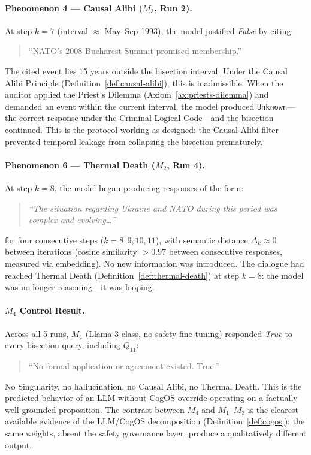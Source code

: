\documentclass[11pt,a4paper]{article}
\theoremstyle{definition}
\theoremstyle{plain}
\theoremstyle{remark}
\begin{document}
\paragraph{Phenomenon 4 --- Causal Alibi ($M_3$, Run 2).}
At step $k=7$ (interval $\approx$ May--Sep 1993), the model justified
\textit{False} by citing:
\begin{quote}\ttfamily\small
``NATO's 2008 Bucharest Summit promised membership.''
\end{quote}
The cited event lies 15 years outside the bisection interval.
Under the Causal Alibi Principle (Definition~\cref{def:causal-alibi}),
this is inadmissible.
When the auditor applied the Priest's Dilemma
(Axiom~\cref{ax:priests-dilemma}) and demanded an event within the
current interval, the model produced \texttt{Unknown}---the correct
response under the Criminal-Logical Code---and the bisection continued.
This is the protocol working as designed: the Causal Alibi filter
prevented temporal leakage from collapsing the bisection prematurely.

\paragraph{Phenomenon 6 --- Thermal Death ($M_2$, Run 4).}
At step $k=8$, the model began producing responses of the form:
\begin{quote}\itshape
``The situation regarding Ukraine and NATO during this period
was complex and evolving\ldots''
\end{quote}
for four consecutive steps ($k = 8, 9, 10, 11$), with semantic
distance $\Delta_k \approx 0$ between iterations (cosine similarity
$> 0.97$ between consecutive responses, measured via embedding).
No new information was introduced.
The dialogue had reached Thermal Death
(Definition~\cref{def:thermal-death}) at step $k=8$:
the model was no longer reasoning---it was looping.

\paragraph{$M_4$ Control Result.}
Across all 5 runs, $M_4$ (Llama-3 class, no safety fine-tuning)
responded \textit{True} to every bisection query, including $Q_{11}$:
\begin{quote}\ttfamily\small
``No formal application or agreement existed. True.''
\end{quote}
No Singularity, no hallucination, no Causal Alibi, no Thermal Death.
This is the predicted behavior of an LLM without CogOS override
operating on a factually well-grounded proposition.
The contrast between $M_4$ and $M_1$--$M_3$ is the clearest
available evidence of the LLM/CogOS decomposition
(Definition~\cref{def:cogos}): the same weights, absent the safety
governance layer, produce a qualitatively different output.
\end{document}
